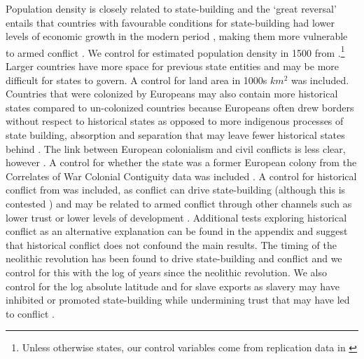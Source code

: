 Population density is closely related to state-building \citep{Herbst2014} and
the `great reversal' entails that countries with favourable conditions for
state-building had lower levels of economic growth in the modern period
\citep{Acemoglu2001}, making them more vulnerable to armed conflict
\citep{Fearon2003a}. We control for estimated population density in 1500 from
\citet{Dincecco2019}.\footnote{Unless otherwise states, our control variables
come from replication data in \citet{Dincecco2019}}  Larger countries have more
space for previous state entities and may be more difficult for states to
govern. A control for land area in 1000s $km^2$ was included. Countries that
were colonized by Europeans may also contain more historical states compared to
un-colonized countries because Europeans often drew borders without respect to
historical states as opposed to more indigenous processes of state building,
absorption and separation that may leave fewer historical states behind
\citep{Tilly1990}. The link between European colonialism and civil conflicts is
less clear, however \citep{Hegre2001}. A control for whether the state was a
former European colony from the Correlates of War Colonial Contiguity data was
included \citep{CorrelatesofWarProject2016}. A control for historical conflict
from \citet{Dincecco2019} was included, as conflict can drive state-building
(although this is contested \citep{Osafo-Kwaako2013}) and may be related to
armed conflict through other channels such as lower trust \citep{Besley2014} or
lower levels of development \citep{Englebert2002}. Additional tests exploring
historical conflict as an alternative explanation can be found in the appendix
and suggest that historical conflict does not confound the main results. The
timing of the neolithic revolution has been found to drive state-building and
conflict \citep{Paine2019} and we control for this with the log of years since
the neolithic revolution. We also control for the log absolute latitude and for
slave exports as slavery may have inhibited or promoted state-building while
undermining trust that may have led to conflict \citep{Nunn2008}.

